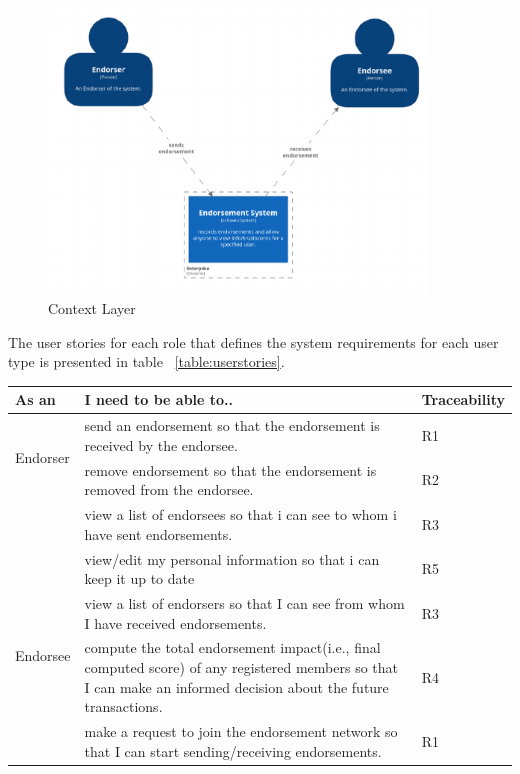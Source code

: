 \begin{figure}
	\centering
	\includegraphics[width=0.9\textwidth]{Images/1SystemContext.eps}
	\caption{Context Layer}
	\label{fig:context}
\end{figure}

The user stories for each role that defines the system requirements for each
user type is presented in table ~\ref{table:userstories}. 
\begin{center} \label{table:userstories}
	\begin{tabular} {| l | p{9cm} | l |}
		\hline
		\textbf{As an}  & \textbf{I need to be able to..}   & \textbf{Traceability} \\
		\hline
		\multirow{2}{*}{Endorser} & send an endorsement so that the endorsement
		is received by the endorsee.& R1
		\\\cline{2-3} 
		& remove endorsement so that the endorsement is removed from the
		endorsee.  & R2 \\\cline{2-3}
		& view a list of endorsees so that i can see to whom i have sent
		endorsements.& R3 \\\cline{2-3}
		& view/edit my personal information so that i can keep it up to
		date& R5 \\\cline{2-3}
		\hline
		\multirow{2}{*}{Endorsee} & view a list of endorsers so that I can see
		from whom I have received endorsements.& R3 \\\cline{2-3}
		\hline
		\multirow{2}{*}{other users} & compute the total endorsement
		impact(i.e., final computed score) of any registered members so that I
		can make an informed decision about the future transactions.
		& R4 \\\cline{2-3}
		& make a request to join the endorsement network so that I can start
		sending/receiving endorsements.  
		& R1 \\\cline{2-3}
		\hline
	\end{tabular}
\end{center}

